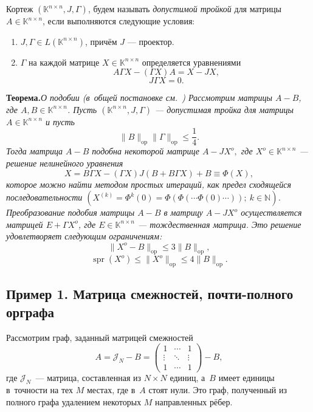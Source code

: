 \documentclass[12pt]{article}
\begin{document}
Кортеж \( (\mathbb{K}^{n{\times}n}, J, \Gamma) \),
    будем называть \emph{допустимой тройкой}
    для матрицы \( A\in\mathbb{K}^{n\times n} \),
    если выполняются следующие условия:
\begin{enumerate}
\item
    \( J,\Gamma\in L(\mathbb{K}^{n{\times}n}) \),
    причём \( J \) --- проектор.
\item
    \( \Gamma \) на каждой матрице \( X\in \mathbb{K}^{n\times n} \)
    определяется уравнениями
    \[ A\Gamma X - (\Gamma X) A = X - JX, \]
    \[ J\Gamma X = 0. \]
\end{enumerate}

\begingroup
\textbf{Теорема.}\itshape{О подобии (в~общей постановке см.~\cite{baskakov-harmonic,baskakov1983})}
    Рассмотрим матрицы \( A-B \),
        где \( A,B\in \mathbb{K}^{n{\times}n} \).
    Пусть \( (\mathbb{K}^{n\times n}, J, \Gamma) \)
        --- допустимая тройка для матрицы \( A\in\mathbb{K}^{n{\times}n} \)
        и пусть
    \[
        \|B\|_{\mathrm{op}} \|\Gamma\|_{\mathrm{op}} \leq \frac14.
        \]
    Тогда матрица \( A-B \)
        подобна некоторой матрице \( A - J X^o, \)
        где \( X^o\in\mathbb{K}^{n{\times}n} \)
        --- решение нелинейного уравнения
    \[
        X = B\Gamma X - (\Gamma X)J(B + B\Gamma X) + B \equiv \Phi(X),
        \]
        которое можно найти методом простых итераций,
        как предел сходящейся последовательности
        \( \left(X^{(k)} = \Phi^{k}(0) = \Phi(\Phi(\cdots\Phi(0)\cdots));\  k\in\mathbb{N} \right) \).
    Преобразование подобия матрицы \( A-B \)
        в матрицу \( A-JX^o \) осуществляется
        матрицей \( E+\Gamma X^o \),
        где \( E\in\mathbb{K}^{n{\times}n} \) --- тождественная матрица.
    Это решение удовлетворяет следующим ограничениям:
    \[ \|X^o - B\|_{\mathrm{op}} \leq 3\|B\|_{\mathrm{op}}, \]
    \[ \operatorname{spr}(X^o) \leq \|X^o\|_{\mathrm{op}} \leq 4\|B\|_{\mathrm{op}}. \]
\endgroup
\subsection*{Пример 1. Матрица смежностей, почти-полного орграфа}
Рассмотрим граф, заданный матрицей смежностей
\[ A = \mathcal{J}_N - B =
   \begin{pmatrix}1 & \cdots & 1\\ \vdots & \ddots & \vdots \\ 1 & \cdots & 1\end{pmatrix} - B,
   \]
    где \( \mathcal{J}_N \)~--- матрица, составленная из \( N{\times}N \) единиц,
    а~\( B \) имеет единицы в~точности на тех \( M \) местах,
    где в~\( A \) стоят нули.
Это граф, полученный из полного графа
    удалением некоторых \( M \) направленных рёбер.
\end{document}
